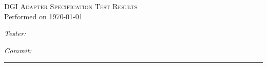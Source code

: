 \documentclass{article}
\newcommand{\testerName}{}
\newcommand{\commitHash}{}
\begin{document}
\begin{titlepage}
\begin{center}
\textsc{\huge DGI Adapter Specification Test Results} \\ [0.25cm]
\Large Performed on \today \\ [0.5cm]

\begin{minipage}[t]{0.4\textwidth}
\large \emph{Tester:} \\ \testerName
\end{minipage}
\begin{minipage}[t]{0.4\textwidth}
\raggedleft\large\emph{Commit:} \\ \commitHash
\end{minipage}

\vspace{0.5cm}\hrule

\end{center}
\end{titlepage}
\end{document}
